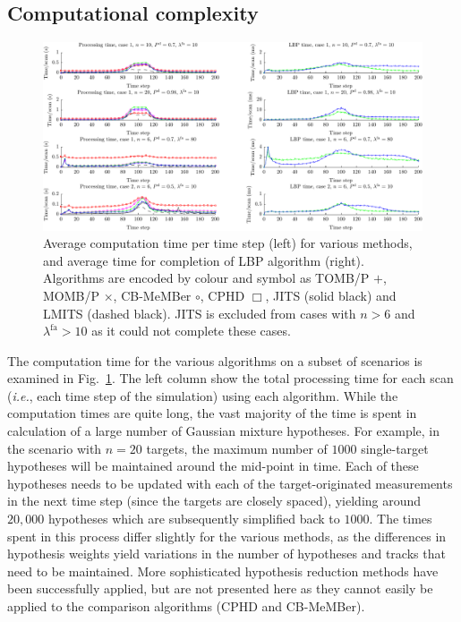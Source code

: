 \documentclass[journal,twoside]{IEEEtran}
\theoremstyle{plain}
\begin{document}
\subsection{Computational complexity}
\label{ss:ExpComputation}
%
\begin{figure}[!t]
\centering
\includegraphics[width=7in]{figure6.pdf}
\vspace{-6pt}
\caption{Average computation time per time step (left) for various methods, and average time for completion of LBP algorithm (right). Algorithms are encoded by colour and symbol as TOMB/P {\color{blue}$+$}, MOMB/P {\color{green}$\times$}, CB-MeMBer {\color[rgb]{1,0,1}$\circ$}, CPHD {\color{red}$\Box$}, JITS (solid black) and LMITS (dashed black). JITS is excluded from cases with $n>6$ and $\lambda^\mathrm{fa}>10$ as it could not complete these cases.}
\label{fig:TimeResults}
\vspace{-6pt}
\end{figure}
%
The computation time for the various algorithms on a subset of scenarios is examined in Fig.~\ref{fig:TimeResults}. The left column show the total processing time for each scan (\textit{i.e.}\xspace, each time step of the simulation) using each algorithm. While the computation times are quite long, the vast majority of the time is spent in calculation of a large number of Gaussian mixture hypotheses. For example, in the scenario with $n=20$ targets, the maximum number of $1000$ single-target hypotheses will be maintained around the mid-point in time. Each of these hypotheses needs to be updated with each of the target-originated measurements in the next time step (since the targets are closely spaced), yielding around $20,\!000$ hypotheses which are subsequently simplified back to $1000$. The times spent in this process differ slightly for the various methods, as the differences in hypothesis weights yield variations in the number of hypotheses and tracks that need to be maintained. More sophisticated hypothesis reduction methods have been successfully applied, but are not presented here as they cannot easily be applied to the comparison algorithms (CPHD and CB-MeMBer).
\end{document}
